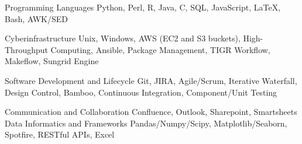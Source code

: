 

\begin{cvskills}

  \cvskill
    {Programming Languages} %
    {Python, Perl, R, Java, C, SQL, JavaScript, LaTeX, Bash, AWK/SED} %

  \cvskill
    {Cyberinfrastructure} %
    {Unix, Windows, AWS (EC2 and S3 buckets), High-Throughput Computing, Ansible, Package Management, TIGR Workflow, Makeflow, Sungrid Engine} %

  \cvskill
    {Software Development and Lifecycle} %
    {Git, JIRA, Agile/Scrum, Iterative Waterfall, Design Control, Bamboo, Continuous Integration, Component/Unit Testing} %

    \cvskill
    {Communication and Collaboration}
    {Confluence, Outlook, Sharepoint, Smartsheets}
    \cvskill
    {Data Informatics and Frameworks}
    {Pandas/Numpy/Scipy, Matplotlib/Seaborn, Spotfire, RESTful APIs, Excel}






\end{cvskills}
